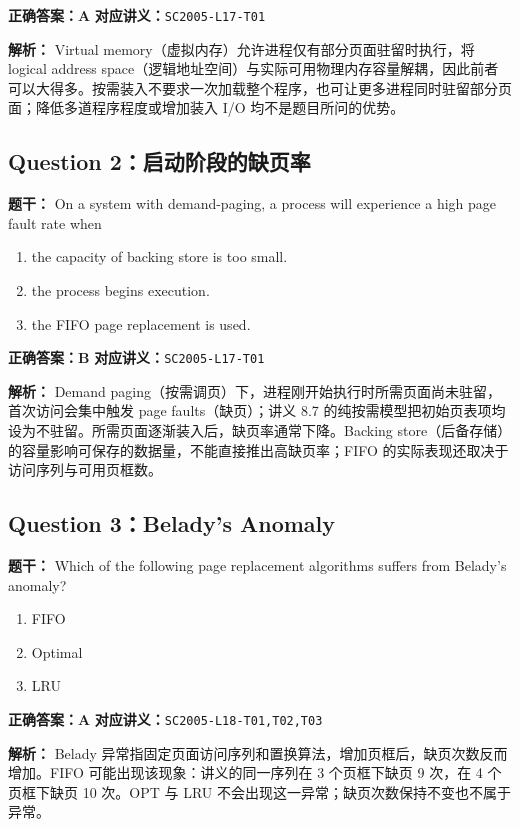 \documentclass[11pt,a4paper,fontset=fandol]{ctexart}
\renewcommand{\exercisequestion}[2]{%
  \Needspace{5\baselineskip}%
  \subsection{#2}\label{exercise:#1}%
}
\renewenvironment{checkedsolution}
  {\par\nopagebreak[4]\textbf{解析：}\ignorespaces}
  {\par}
\begin{document}
\textbf{正确答案：A}\qquad
\textbf{对应讲义：}\texttt{SC2005-L17-T01}

\begin{checkedsolution}
Virtual memory（虚拟内存）允许进程仅有部分页面驻留时执行，将 logical address space（逻辑地址空间）与实际可用物理内存容量解耦，因此前者可以大得多。按需装入不要求一次加载整个程序，也可让更多进程同时驻留部分页面；降低多道程序程度或增加装入 I/O 均不是题目所问的优势。
\end{checkedsolution}

\exercisequestion{SC2005-HW06-Q02}{Question 2：启动阶段的缺页率}

\textbf{题干：} On a system with demand-paging, a process will experience a high page fault rate when

\begin{enumerate}[label=\Alph*.,leftmargin=2.4em]
  \item the capacity of backing store is too small.
  \item the process begins execution.
  \item the FIFO page replacement is used.
\end{enumerate}

\textbf{正确答案：B}\qquad
\textbf{对应讲义：}\texttt{SC2005-L17-T01}

\begin{checkedsolution}
Demand paging（按需调页）下，进程刚开始执行时所需页面尚未驻留，首次访问会集中触发 page faults（缺页）；讲义 8.7 的纯按需模型把初始页表项均设为不驻留。所需页面逐渐装入后，缺页率通常下降。Backing store（后备存储）的容量影响可保存的数据量，不能直接推出高缺页率；FIFO 的实际表现还取决于访问序列与可用页框数。
\end{checkedsolution}

\exercisequestion{SC2005-HW06-Q03}{Question 3：Belady's Anomaly}

\textbf{题干：} Which of the following page replacement algorithms suffers from Belady's anomaly?

\begin{enumerate}[label=\Alph*.,leftmargin=2.4em]
  \item FIFO
  \item Optimal
  \item LRU
\end{enumerate}

\textbf{正确答案：A}\qquad
\textbf{对应讲义：}\texttt{SC2005-L18-T01,T02,T03}

\begin{checkedsolution}
Belady 异常指固定页面访问序列和置换算法，增加页框后，缺页次数反而增加。FIFO 可能出现该现象：讲义的同一序列在 3 个页框下缺页 9 次，在 4 个页框下缺页 10 次。OPT 与 LRU 不会出现这一异常；缺页次数保持不变也不属于异常。
\end{checkedsolution}
\end{document}
